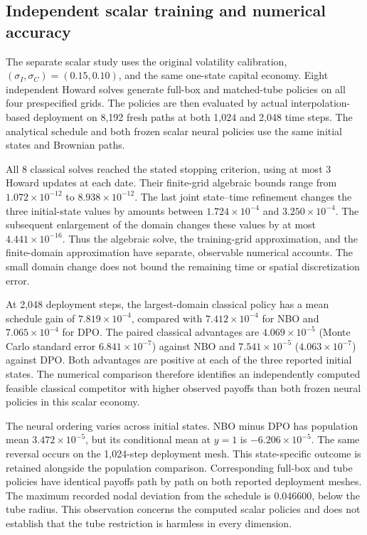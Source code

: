 \subsection{Independent scalar training and numerical accuracy}

\label{sec:r15scalarresults}

The separate scalar study uses the original volatility calibration, $(\sigma_I,\sigma_C)=(0.15,0.10)$, and the same one-state capital economy. Eight independent Howard solves generate full-box and matched-tube policies on all four prespecified grids. The policies are then evaluated by actual interpolation-based deployment on 8,192 fresh paths at both 1,024 and 2,048 time steps. The analytical schedule and both frozen scalar neural policies use the same initial states and Brownian paths.



All 8 classical solves reached the stated stopping criterion, using at most 3 Howard updates at each date. Their finite-grid algebraic bounds range from $1.072\times10^{-12}$ to $8.938\times10^{-12}$. The last joint state--time refinement changes the three initial-state values by amounts between $1.724\times10^{-4}$ and $3.250\times10^{-4}$. The subsequent enlargement of the domain changes these values by at most $4.441\times10^{-16}$. Thus the algebraic solve, the training-grid approximation, and the finite-domain approximation have separate, observable numerical accounts. The small domain change does not bound the remaining time or spatial discretization error.



At 2,048 deployment steps, the largest-domain classical policy has a mean schedule gain of $7.819\times10^{-4}$, compared with $7.412\times10^{-4}$ for NBO and $7.065\times10^{-4}$ for DPO. The paired classical advantages are $4.069\times10^{-5}$ (Monte Carlo standard error $6.841\times10^{-7}$) against NBO and $7.541\times10^{-5}$ ($4.063\times10^{-7}$) against DPO. Both advantages are positive at each of the three reported initial states. The numerical comparison therefore identifies an independently computed feasible classical competitor with higher observed payoffs than both frozen neural policies in this scalar economy.

The neural ordering varies across initial states. NBO minus DPO has population mean $3.472\times10^{-5}$, but its conditional mean at $y=1$ is $-6.206\times10^{-5}$. The same reversal occurs on the 1,024-step deployment mesh. This state-specific outcome is retained alongside the population comparison. Corresponding full-box and tube policies have identical payoffs path by path on both reported deployment meshes. The maximum recorded nodal deviation from the schedule is 0.046600, below the tube radius. This observation concerns the computed scalar policies and does not establish that the tube restriction is harmless in every dimension.

